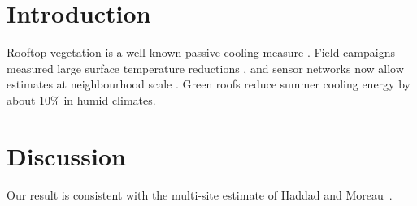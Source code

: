 \documentclass{article}
\begin{document}
\section{Introduction}
Rooftop vegetation is a well-known passive cooling measure \cite{varga2005}. Field campaigns measured large surface temperature reductions \cite{okafor2011,zhou2021}, and sensor networks now allow estimates at neighbourhood scale \citep{haddad2022}. Green roofs reduce summer cooling energy by about 10\% in humid climates.

\section{Discussion}
Our result is consistent with the multi-site estimate of Haddad and Moreau~\cite{haddad2022,missing2020}.



\end{document}
